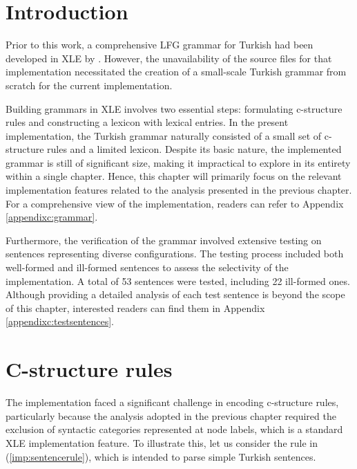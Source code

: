 \section{Introduction}

Prior to this work, a comprehensive LFG grammar for Turkish had been developed in XLE by \citet{cetinoglu2009}. However, the unavailability of the source files for that implementation necessitated the creation of a small-scale Turkish grammar from scratch for the current implementation.

\begin{sloppypar}
Building grammars in XLE involves two essential steps: formulating c-structure rules and constructing a lexicon with lexical entries. In the present implementation, the Turkish grammar naturally consisted of a small set of c-structure rules and a limited lexicon. Despite its basic nature, the implemented grammar is still of significant size, making it impractical to explore in its entirety within a single chapter. Hence, this chapter will primarily focus on the relevant implementation features related to the analysis presented in the previous chapter. For a comprehensive view of the implementation, readers can refer to Appendix \ref{appendixc:grammar}.
\end{sloppypar}

Furthermore, the verification of the grammar involved extensive testing on sentences representing diverse configurations. The testing process included both well-formed and ill-formed sentences to assess the selectivity of the implementation. A total of 53 sentences were tested, including 22 ill-formed ones. Although providing a detailed analysis of each test sentence is beyond the scope of this chapter, interested readers can find them in Appendix \ref{appendixc:testsentences}.


\section{C-structure rules} \label{sec:cstructure-rules}

The implementation faced a significant challenge in encoding c-structure rules, particularly because the analysis adopted in the previous chapter required the exclusion of syntactic categories represented at node labels, which is a standard XLE implementation feature. To illustrate this, let us consider the rule in (\ref{imp:sentencerule}), which is intended to parse simple Turkish sentences.


\pex
\label{imp:sentencerule}
\vspace{-12pt}

